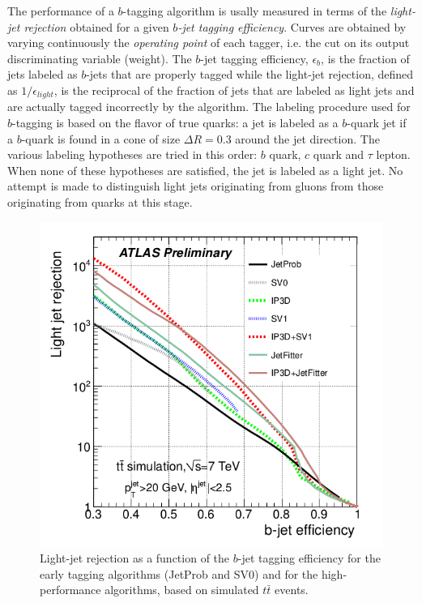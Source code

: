  The performance of a $b$-tagging algorithm is usally  measured in terms of the \emph{light-jet rejection} obtained for a given \emph{$b$-jet tagging efficiency}.  Curves are obtained by varying continuously the \emph{operating point} of each tagger, i.e. the cut on its output discriminating variable (weight).  The $b$-jet tagging efficiency,  $\epsilon_b$,  is the fraction of jets labeled as $b$-jets that are properly tagged while the light-jet rejection, defined as $1/\epsilon_{light}$, is the reciprocal of the fraction of jets that are labeled as light jets and are actually tagged incorrectly by the algorithm. The labeling procedure used for $b$-tagging is based on the flavor of true quarks: a jet is labeled as a $b$-quark jet if a $b$-quark is found in a cone of size $\Delta R = 0.3$ around the jet direction.  The various labeling hypotheses are tried in this order: $b$ quark, $c$ quark and $\tau$ lepton. When none of these hypotheses are satisfied, the jet
is labeled as a light jet. No attempt is made to distinguish light jets originating from gluons from those originating from quarks at this stage.

\begin{figure}[htbp]
  \begin{center}
      \includegraphics[width=1\textwidth]{btaggingperformance.png}
    \caption{Light-jet rejection as a function of the $b$-jet tagging efficiency for the early tagging algorithms (JetProb and SV0) and for the high-performance algorithms, based on simulated $t\bar{t}$ events. }
    \label{fig:btaggingperformance}
  \end{center}
\end{figure}

